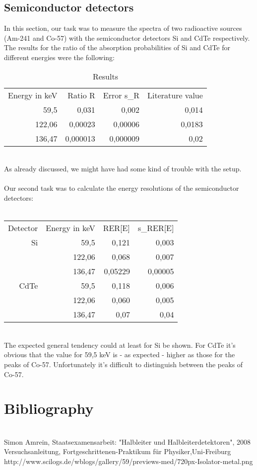 \section{Semiconductor detectors}
In this section, our task was to measure the spectra of two radioactive sources (Am-241 and Co-57) with the semiconductor detectors Si and CdTe respectively.\\
The results for the ratio of the absorption probabilities of Si and CdTe for different energies were the following:\\
\begin{table}[htbp]
  \centering
  \caption{Results}
    \begin{tabular}{rrrr}
    Energy in keV & Ratio R & Error s\_R & Literature value \\
    59,5  & 0,031 & 0,002 & 0,014 \\
    122,06 & 0,00023 & 0,00006 & 0,0183 \\
    136,47 & 0,000013 & 0,000009 & 0,02 \\
    \end{tabular}%
  \label{tab:addlabel}%
\end{table}%
~\\
As already discussed, we might have had some kind of trouble with the setup. \\
~\\
Our second task was to calculate the energy resolutions of the semiconductor detectors:\\
~\\
  \caption{Energy resolutions}
      \begin{tabular}{rrrr}
      Detector & Energy in keV & RER[E]  & s\_RER[E] \\
      Si    & 59,5  & 0,121 & 0,003 \\
            & 122,06 & 0,068 & 0,007 \\
            & 136,47 & 0,05229 & 0,00005 \\
      CdTe  & 59,5  & 0,118  & 0,006 \\
            & 122,06 & 0,060 & 0,005 \\
            & 136,47 & 0,07  & 0,04 \\
      \end{tabular}%
    \label{tab:addlabela}%
~\\
  The expected general tendency could at least for Si be shown. For CdTe it's obvious that the value for 59,5 keV is - as expected - higher as those for the peaks of Co-57. Unfortunately it's difficult to distinguish between the peaks of Co-57.

\newpage
\chapter{Bibliography}
~\\
[Amr] Simon Amrein, Staatsexamensarbeit: "Halbleiter und Halbleiterdetektoren", 2008\\
[Ver] Versuchsanleitung, Fortgeschrittenen-Praktikum für Physiker,Uni-Freiburg\\
[Sclo] http://www.scilogs.de/wblogs/gallery/59/previews-med/720px-Isolator-metal.png\\